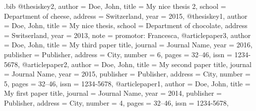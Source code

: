 \RequirePackage{filecontents}
\begin{filecontents*}{\jobname.bib}
	@thesis{key2,
		author  = {Doe, John},
		title   = {My nice thesis 2},
		school  = {Department of cheese},
		address = {Switzerland},
		year    = {2015},
	}
	@thesis{key1,
		author  = {Doe, John},
		title   = {My nice thesis},
		school  = {Department of chocolate},
		address = {Switserland},
		year    = {2013},
		note    = {promotor: Francesca},
	}
	@article{paper3,
		author    = {Doe, John}, 
		title     = {My third paper title}, 
		journal   = {Journal Name},
		year      = {2016}, 
		publisher = {Publisher},
		address   = {City},
		number    = {6}, 
		pages     = {32--46}, 
		issn      = {1234-5678},
	}
	@article{paper2,
		author    = {Doe, John}, 
		title     = {My second paper title}, 
		journal   = {Journal Name},
		year      = {2015}, 
		publisher = {Publisher},
		address   = {City},
		number    = {5}, 
		pages     = {32--46}, 
		issn      = {1234-5678},
	}
	@article{paper1,
		author    = {Doe, John}, 
		title     = {My first paper title}, 
		journal   = {Journal Name},
		year      = {2014}, 
		publisher = {Publisher},
		address   = {City},
		number    = {4}, 
		pages     = {32--46}, 
		issn      = {1234-5678},
	}
\end{filecontents*}


\documentclass[11pt,sans]{moderncv}

\usepackage[%
backend=biber,
defernumbers=true,
sorting=ydnt,         %
]{biblatex}

\makeatletter
\newcommand{\citesinthissection}[1]{\xdef\@totalcites{#1}}
{\list
	{\printtext[labelnumberwidth]{%
			\printfield{labelprefix}%
			\number\numexpr\@totalcites-\abx@field@labelnumber+1\relax}}
	{\setlength{\topsep}{0pt}%
		\setlength{\labelwidth}{\hintscolumnwidth}%
		\setlength{\labelsep}{\separatorcolumnwidth}%
		\leftmargin\labelwidth%
		\advance\leftmargin\labelsep}%
	\sloppy\clubpenalty4000\widowpenalty4000}
{\endlist}
{\item}
\makeatother

